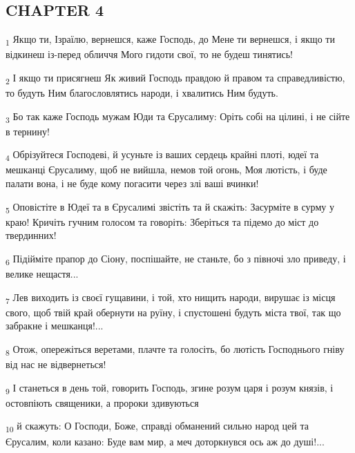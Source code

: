\subsection{CHAPTER 4}
\begin{tcolorbox}
\textsubscript{1} Якщо ти, Ізраїлю, вернешся, каже Господь, до Мене ти вернешся, і якщо ти відкинеш із-перед обличчя Мого гидоти свої, то не будеш тинятись!
\end{tcolorbox}
\begin{tcolorbox}
\textsubscript{2} І якщо ти присягнеш Як живий Господь правдою й правом та справедливістю, то будуть Ним благословлятись народи, і хвалитись Ним будуть.
\end{tcolorbox}
\begin{tcolorbox}
\textsubscript{3} Бо так каже Господь мужам Юди та Єрусалиму: Оріть собі на цілині, і не сійте в тернину!
\end{tcolorbox}
\begin{tcolorbox}
\textsubscript{4} Обрізуйтеся Господеві, й усуньте із ваших сердець крайні плоті, юдеї та мешканці Єрусалиму, щоб не вийшла, немов той огонь, Моя лютість, і буде палати вона, і не буде кому погасити через злі ваші вчинки!
\end{tcolorbox}
\begin{tcolorbox}
\textsubscript{5} Оповістіте в Юдеї та в Єрусалимі звістіть та й скажіть: Засурміте в сурму у краю! Кричіть гучним голосом та говоріть: Зберіться та підемо до міст до твердинних!
\end{tcolorbox}
\begin{tcolorbox}
\textsubscript{6} Підійміте прапор до Сіону, поспішайте, не станьте, бо з півночі зло приведу, і велике нещастя...
\end{tcolorbox}
\begin{tcolorbox}
\textsubscript{7} Лев виходить із своєї гущавини, і той, хто нищить народи, вирушає із місця свого, щоб твій край обернути на руїну, і спустошені будуть міста твої, так що забракне і мешканця!...
\end{tcolorbox}
\begin{tcolorbox}
\textsubscript{8} Отож, опережіться веретами, плачте та голосіть, бо лютість Господнього гніву від нас не відвернеться!
\end{tcolorbox}
\begin{tcolorbox}
\textsubscript{9} І станеться в день той, говорить Господь, згине розум царя і розум князів, і остовпіють священики, а пророки здивуються
\end{tcolorbox}
\begin{tcolorbox}
\textsubscript{10} й скажуть: О Господи, Боже, справді обманений сильно народ цей та Єрусалим, коли казано: Буде вам мир, а меч доторкнувся ось аж до душі!...
\end{tcolorbox}
